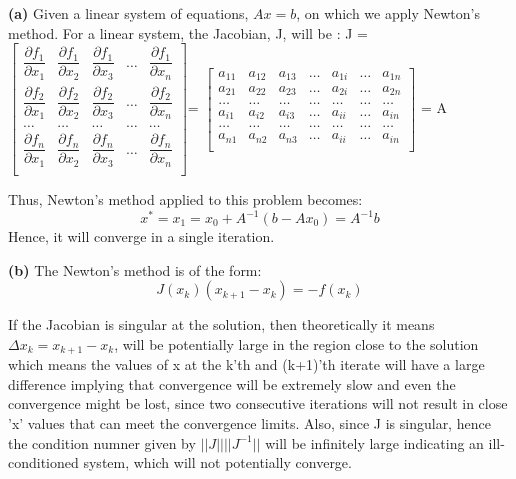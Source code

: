 \documentclass{article}
\renewcommand\part[1]{\vspace{.10in}\textbf{(#1)}}
\begin{document}
\part{a} Given a linear system of equations, $Ax=b$, on which we apply Newton's method. For a linear system, the Jacobian, J, will be :
J = $\begin{bmatrix}
	\dfrac{\partial f_1}{\partial x_1} & \dfrac{\partial f_1}{\partial x_2} & \dfrac{\partial f_1}{\partial x_3} & \dots & \dfrac{\partial f_1}{\partial x_n}\\
	\dfrac{\partial f_2}{\partial x_1} & \dfrac{\partial f_2}{\partial x_2} & \dfrac{\partial f_2}{\partial x_3} & \dots & \dfrac{\partial f_2}{\partial x_n}\\
	\dots & \dots & \dots & \dots & \dots \\
	\dfrac{\partial f_n}{\partial x_1} & \dfrac{\partial f_n}{\partial x_2} & \dfrac{\partial f_n}{\partial x_3} & \dots & \dfrac{\partial f_n}{\partial x_n}\\
\end{bmatrix}$\newline \newline = $\begin{bmatrix}
		a_{11} & a_{12} & a_{13} & \dots & a_{1i} & \dots & a_{1n} \\
		a_{21} & a_{22} & a_{23} & \dots & a_{2i} & \dots & a_{2n} \\
		\dots & \dots & \dots & \dots & \dots & \dots & \dots \\
		a_{i1} & a_{i2} & a_{i3} & \dots & a_{ii} & \dots & a_{in} \\
		\dots & \dots & \dots & \dots & \dots & \dots & \dots \\
		a_{n1} & a_{n2} & a_{n3} & \dots & a_{ii} & \dots & a_{in} \\
		 \end{bmatrix}$ = A  \newline

 Thus, Newton's method applied to this problem becomes:
 \[ x^* = x_1 = x_0 + A^{-1}(b - Ax_0) = A^{-1}b\]
 Hence, it will converge in a single iteration.

 \part{b}
 The Newton's method is of the form:
 \[ J(x_k)(x_{k+1} - x_k) = -f(x_k)\]

 If the Jacobian is singular at the solution, then theoretically it means $\Delta x_k = x_{k+1} - x_k$, will be potentially large in the region close to the solution which means the values of x at the k'th and (k+1)'th iterate will have a large difference implying that convergence will be extremely slow and even the convergence might be lost, since two consecutive iterations will not result in close 'x' values that can meet the convergence limits. Also, since J is singular, hence the condition numner given by $||J||||J^{-1}||$ will be infinitely large indicating an ill-conditioned system, which will not potentially converge. \newline
\end{document}
